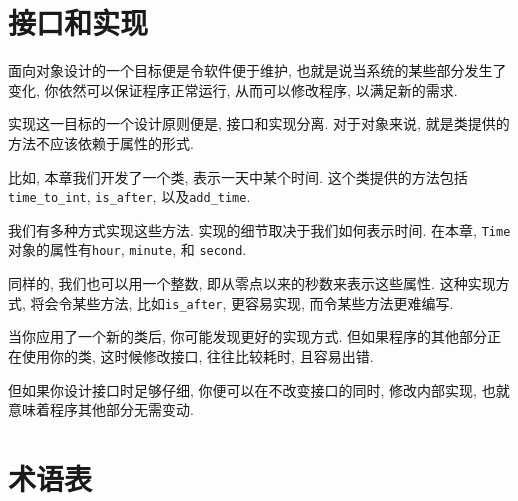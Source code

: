 \documentclass[10pt]{book}
\begin{document}
\section{接口和实现}

面向对象设计的一个目标便是令软件便于维护, 
也就是说当系统的某些部分发生了变化, 你依然可以保证程序正常运行, 
从而可以修改程序, 以满足新的需求. 

实现这一目标的一个设计原则便是, 接口和实现分离. 
对于对象来说, 就是类提供的方法不应该依赖于属性的形式. 

比如, 本章我们开发了一个类, 表示一天中某个时间. 
这个类提供的方法包括
\verb"time_to_int", \verb"is_after", 以及\verb"add_time".

我们有多种方式实现这些方法. 
实现的细节取决于我们如何表示时间. 
在本章, {\tt Time}对象的属性有{\tt hour}, {\tt minute}, 和
{\tt second}. 

同样的, 我们也可以用一个整数, 即从零点以来的秒数来表示这些属性. 
这种实现方式, 将会令某些方法, 比如\verb"is_after", 更容易实现, 而令某些方法更难编写. 

当你应用了一个新的类后, 你可能发现更好的实现方式. 
但如果程序的其他部分正在使用你的类, 这时候修改接口, 
往往比较耗时, 且容易出错. 

但如果你设计接口时足够仔细, 你便可以在不改变接口的同时, 修改内部实现, 
也就意味着程序其他部分无需变动. 


\section{术语表}
\end{document}
